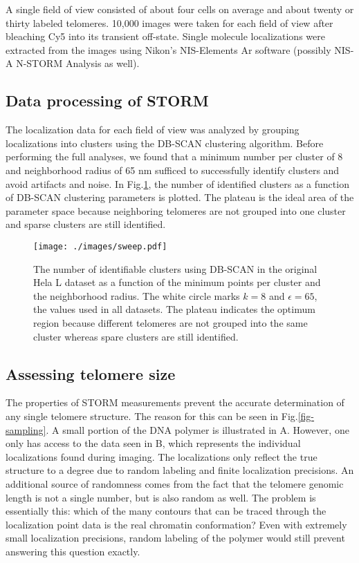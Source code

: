 \documentclass[11pt]{article}
\begin{document}
A single field of view consisted of about four cells on average and
about twenty or thirty labeled telomeres. 10,000 images were taken for
each field of view after bleaching Cy5 into its transient
off-state. Single molecule localizations were extracted from the
images using Nikon's NIS-Elements Ar software (possibly NIS-A N-STORM
Analysis as well).

\subsection{Data processing of STORM}
\label{sec-2-1}
The localization data for each field of view was analyzed by grouping
localizations into clusters using the DB-SCAN clustering
algorithm. Before performing the full analyses, we found that a
minimum number per cluster of 8 and neighborhood radius of 65 nm
sufficed to successfully identify clusters and avoid artifacts and
noise. In Fig.\ref{fig-sweep}, the number of identified clusters as a
function of DB-SCAN clustering parameters is plotted. The plateau is
the ideal area of the parameter space because neighboring telomeres
are not grouped into one cluster and sparse clusters are still
identified.

\begin{figure}[htb]
\centering
\texttt{[image: ./images/sweep.pdf]}
\caption{\label{fig-sweep}The number of identifiable clusters using DB-SCAN in the original Hela L dataset as a function of the minimum points per cluster and the neighborhood radius. The white circle marks $k = 8$ and $\epsilon = 65$, the values used in all datasets. The plateau indicates the optimum region because different telomeres are not grouped into the same cluster whereas spare clusters are still identified.}
\end{figure}

\subsection{Assessing telomere size}
\label{sec-2-2}
The properties of STORM measurements prevent the accurate
determination of any single telomere structure. The reason for this
can be seen in Fig.\ref{fig-sampling}. A small portion of the DNA
polymer is illustrated in A. However, one only has access to the data
seen in B, which represents the individual localizations found during
imaging. The localizations only reflect the true structure to a degree
due to random labeling and finite localization precisions. An
additional source of randomness comes from the fact that the telomere
genomic length is not a single number, but is also random as well. The
problem is essentially this: which of the many contours that can be
traced through the localization point data is the real chromatin
conformation? Even with extremely small localization precisions,
random labeling of the polymer would still prevent answering this
question exactly.
\end{document}
